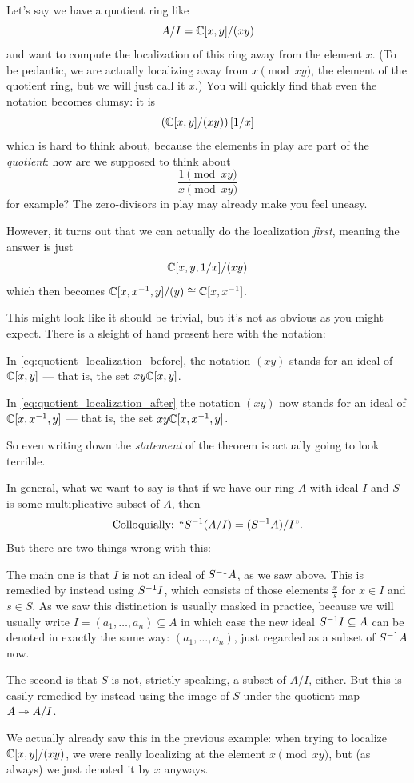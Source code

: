 Let's say we have a quotient ring like
\[ A/I = \mathbb C[x,y] / (xy) \]
and want to compute the localization of this ring
away from the element $x$.
(To be pedantic, we are actually localizing away from $x \pmod{xy}$,
the element of the quotient ring, but we will just call it $x$.)
You will quickly find that even the notation becomes clumsy: it is
\begin{equation}
	\left( \mathbb C[x,y] / (xy) \right)[1/x]
	\label{eq:quotient_localization_before}
\end{equation}
which is hard to think about,
because the elements in play are part of the \emph{quotient}:
how are we supposed to think about
\[ \frac{1 \pmod{xy}}{x \pmod{xy}} \]
for example?
The zero-divisors in play may already make you feel uneasy.

However, it turns out that we can actually do the localization
\emph{first}, meaning the answer is just
\begin{equation}
	\mathbb C[x,y,1/x] / (xy)
	\label{eq:quotient_localization_after}
\end{equation}
which then becomes $\mathbb C[x, x^{-1}, y] / (y) \cong \mathbb C[x,x^{-1}]$.

This might look like it should be trivial,
but it's not as obvious as you might expect.
There is a sleight of hand present here with the notation:
\begin{itemize}
	\ii In \eqref{eq:quotient_localization_before},
	the notation $(xy)$ stands for an ideal of $\mathbb C[x,y]$
	--- that is, the set $xy \mathbb C[x,y]$.

	\ii In \eqref{eq:quotient_localization_after}
	the notation $(xy)$ now stands for an ideal of $\mathbb C[x,x^{-1},y]$
	--- that is, the set $xy \mathbb C[x,x^{-1},y]$.
\end{itemize}
So even writing down the \emph{statement} of the theorem
is actually going to look terrible.

In general, what we want to say is that if we have our ring $A$
with ideal $I$ and $S$ is some multiplicative subset of $A$,
then \[ \text{Colloquially: ``}S^{-1} (A/I) = (S^{-1} A)/I\text{''}. \]
But there are two things wrong with this:
\begin{itemize}
\ii The main one is that $I$ is not an ideal of $S^{-1} A$, as we saw above.
This is remedied by instead using $S^{-1} I$,
which consists of those elements $\frac xs$
for $x \in I$ and $s \in S$.
As we saw this distinction is usually masked in practice,
because we will usually write $I = (a_1, \dots, a_n) \subseteq A$
in which case the new ideal $S^{-1} I \subseteq A$ can be denoted
in exactly the same way: $(a_1, \dots, a_n)$,
just regarded as a subset of $S^{-1} A$ now.

\ii The second is that $S$ is not, strictly speaking,
a subset of $A/I$, either.
But this is easily remedied by instead using the image of $S$
under the quotient map $A \twoheadrightarrow A/I$.

We actually already saw this in the previous example:
when trying to localize $\mathbb C[x,y]/(xy)$,
we were really localizing at the element $x \pmod{xy}$,
but (as always) we just denoted it by $x$ anyways.
\end{itemize}

